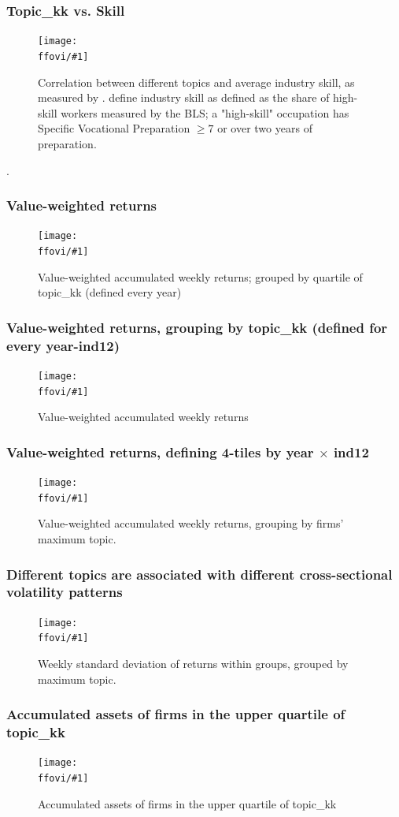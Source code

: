 \documentclass{beamer}
\newcommand{\ffovi}{dicfullmc10thr10defnob5noa0_8_6t}
\newcommand{\insertfigurevi}[2]{
\begin{figure}[h!]
  \centering
  \texttt{[image: \\ffovi/\#1]}
  \centering
  \captionsetup{font=scriptsize}
  \caption{#2}
  \label{fig:#1}
\end{figure}
}
\begin{document}
\begin{frame}
\frametitle{Topic\_kk vs. Skill}
\scriptsize
\insertfigurevi{heatmap}{Correlation between different topics and average industry skill, as measured by \cite{Belo2017-qi}. \cite{Belo2017-qi} define industry skill as defined as the share of high-skill workers measured by the BLS; a "high-skill" occupation has Specific Vocational Preparation $\geq 7$ or over two years of preparation.}. 
\end{frame}

\begin{frame}
\frametitle{Value-weighted returns}
\insertfigurevi{awawr}{Value-weighted accumulated weekly returns; grouped by quartile of topic\_kk (defined every year)}
\end{frame}



\begin{frame}
\frametitle{Value-weighted returns, grouping by topic\_kk (defined for every year-ind12)}
\insertfigurevi{awawr_aggind}{Value-weighted accumulated weekly returns}
\end{frame}

\begin{frame}
\frametitle{Value-weighted returns, defining 4-tiles by year $\times$ ind12}
\insertfigurevi{awawr_byg}{Value-weighted accumulated weekly returns, grouping by firms' maximum topic.}
\end{frame}

\begin{frame}
\frametitle{Different topics are associated with different cross-sectional volatility patterns}
\insertfigurevi{wsdr_byg}{Weekly standard deviation of returns within groups, grouped by maximum topic.}
\end{frame}

\begin{frame}
\frametitle{Accumulated assets of firms in the upper quartile of topic\_kk}
\insertfigurevi{stackedplot_at}{Accumulated assets of firms in the upper quartile of topic\_kk}
\end{frame}
\end{document}
